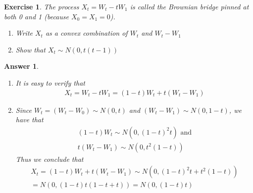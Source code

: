 \documentclass[12pt]{article}
\theoremstyle{colon}
\newtheorem{exercise}{Exercise}
\newtheorem*{answer}{Answer}
\begin{document}
\clearpage

\begin{exercise}
  The process $X_t = W_t -t W_1$ is called the Brownian bridge pinned at both 0 and 1 (because $X_0 = X_1 = 0$).
  \begin{enumerate}[label=\alph*)]
    \item Write $X_t$ as a convex combination of $W_t$ and $W_t - W_1$
    \item Show that $X_t \sim N(0, t(t-1))$
  \end{enumerate}
\end{exercise}

\begin{answer}
  \leavevmode
  \begin{enumerate}[label=\alph*)]
    \item It is easy to verify that
      \begin{gather*}
        X_t = W_t -t W_1 = (1-t)W_t + t(W_t - W_1)
      \end{gather*}
    \item Since $W_t = (W_t - W_0) \sim N(0,t)$ and $(W_t - W_1) \sim N(0, 1-t)$, we have that
      \begin{gather*}
        (1-t)W_t \sim N(0, (1-t)^2t) \text{ and}\\
        t(W_t - W_1) \sim N(0, t^2(1-t))
      \end{gather*}
      Thus we conclude that
      \begin{gather*}
        X_t = (1-t)W_t + t(W_t - W_1) \sim N(0, (1-t)^2t + t^2(1-t)) \\
        = N(0, (1-t)t(1 - t + t)) = N(0, (1-t)t)
      \end{gather*}
  \end{enumerate}
\end{answer}
\end{document}
